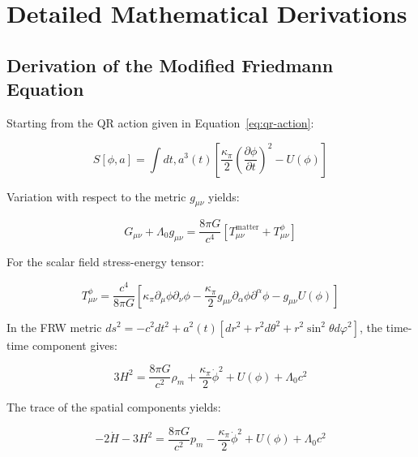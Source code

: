 \section{Detailed Mathematical Derivations}
\label{appendix:derivations}

\subsection{Derivation of the Modified Friedmann Equation}
\label{subsec:friedmann-derivation}

Starting from the QR action given in Equation~\ref{eq:qr-action}:

\begin{equation}
S[\phi, a] = \int dt , a^3(t) \left[ \frac{\kappa_\pi}{2} \left(\frac{\partial \phi}{\partial t}\right)^2 - U(\phi) \right]
\label{eq:qr-action-appendix}
\end{equation}

Variation with respect to the metric $g_{\mu\nu}$ yields:

\begin{equation}
G_{\mu\nu} + \Lambda_0 g_{\mu\nu} = \frac{8\pi G}{c^4} \left[ T_{\mu\nu}^{\text{matter}} + T_{\mu\nu}^{\phi} \right]
\label{eq:varied-einstein}
\end{equation}

For the scalar field stress-energy tensor:

\begin{equation}
T_{\mu\nu}^{\phi} = \frac{c^4}{8\pi G} \left[ \kappa_\pi \partial_\mu \phi \partial_\nu \phi - \frac{\kappa_\pi}{2} g_{\mu\nu} \partial_\alpha \phi \partial^\alpha \phi - g_{\mu\nu} U(\phi) \right]
\label{eq:scalar-stress-energy}
\end{equation}

In the FRW metric $ds^2 = -c^2 dt^2 + a^2(t)[dr^2 + r^2 d\theta^2 + r^2 \sin^2\theta d\varphi^2]$, the time-time component gives:

\begin{equation}
3H^2 = \frac{8\pi G}{c^2}\rho_m + \frac{\kappa_\pi}{2}\dot{\phi}^2 + U(\phi) + \Lambda_0 c^2
\label{eq:00-component}
\end{equation}

The trace of the spatial components yields:

\begin{equation}
-2\dot{H} - 3H^2 = \frac{8\pi G}{c^2}p_m - \frac{\kappa_\pi}{2}\dot{\phi}^2 + U(\phi) + \Lambda_0 c^2
\label{eq:spatial-trace}
\end{equation}

